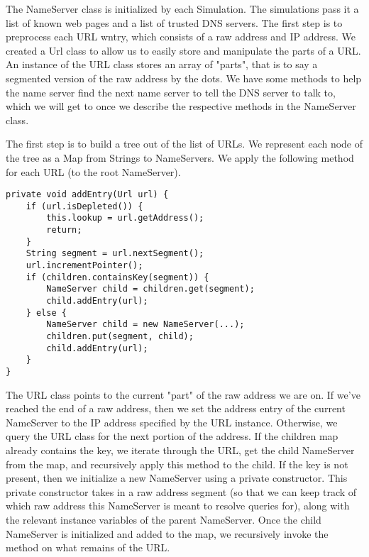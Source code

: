 \documentclass[a4paper, 12pt]{article} %
\begin{document}
The NameServer class is initialized by each Simulation. The simulations pass it a list of known web pages and a list of trusted DNS servers. The first step is to preprocess each URL wntry, which consists of a raw address and IP address. We created a Url class to allow us to easily store and manipulate the parts of a URL. An instance of the URL class stores an array of "parts", that is to say a segmented version of the raw address by the dots. We have some methods to help the name server find the next name server to tell the DNS server to talk to, which we will get to once we describe the respective methods in the NameServer class.

The first step is to build a tree out of the list of URLs. We represent each node of the tree as a Map from Strings to NameServers. We apply the following method for each URL (to the root NameServer).

\begin{lstlisting}
private void addEntry(Url url) {
    if (url.isDepleted()) {
        this.lookup = url.getAddress();
        return;
    }
    String segment = url.nextSegment();
    url.incrementPointer();
    if (children.containsKey(segment)) {
        NameServer child = children.get(segment);
        child.addEntry(url);
    } else {
        NameServer child = new NameServer(...);
        children.put(segment, child);
        child.addEntry(url);
    }
}
\end{lstlisting}

The URL class points to the current "part" of the raw address we are on. If we've reached the end of a raw address, then we set the address entry of the current NameServer to the IP address specified by the URL instance. Otherwise, we query the URL class for the next portion of the address. If the children map already contains the key, we iterate through the URL, get the child NameServer from the map, and recursively apply this method to the child. If the key is not present, then we initialize a new NameServer using a private constructor. This private constructor takes in a raw address segment (so that we can keep track of which raw address this NameServer is meant to resolve queries for), along with the relevant instance variables of the parent NameServer. Once the child NameServer is initialized and added to the map, we recursively invoke the method on what remains of the URL.
\end{document}
